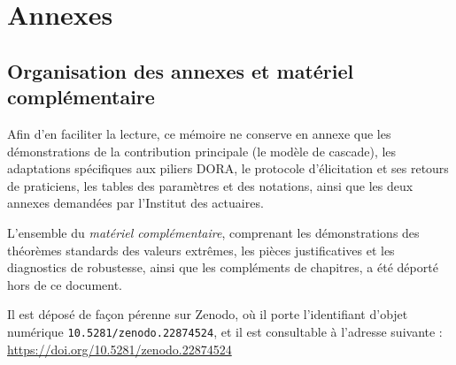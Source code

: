 \documentclass[12pt,a4paper]{report}
\begin{document}
\appendix
\part*{Annexes}

\chapter*{Organisation des annexes et matériel complémentaire}

Afin d'en faciliter la lecture, ce mémoire ne conserve en annexe que les démonstrations de la
contribution principale (le modèle de cascade), les adaptations spécifiques aux piliers DORA,
le protocole d'élicitation et ses retours de praticiens, les tables des paramètres et des
notations, ainsi que les deux annexes demandées par l'Institut des actuaires.

L'ensemble du \emph{matériel complémentaire}, comprenant les démonstrations des théorèmes
standards des valeurs extrêmes, les pièces justificatives et les diagnostics de robustesse,
ainsi que les compléments de chapitres, a été déporté hors de ce document.

Il est déposé de façon pérenne sur Zenodo, où il porte l'identifiant d'objet numérique
\texttt{10.5281/zenodo.22874524}, et il est consultable à l'adresse suivante :
\url{https://doi.org/10.5281/zenodo.22874524}
\end{document}
